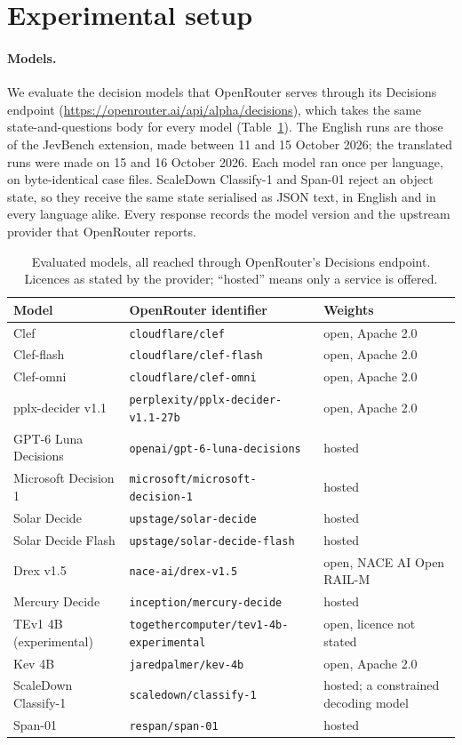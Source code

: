 \section{Experimental setup}
\label{sec:setup}

\paragraph{Models.} We evaluate the \MLnModels{} decision models that
OpenRouter serves through its Decisions endpoint
(\url{https://openrouter.ai/api/alpha/decisions}), which takes the same
state-and-questions body for every model (Table~\ref{tab:models}). The
English runs are those of the JevBench extension, made between 11 and 15
October 2026; the translated runs were made on 15 and 16 October 2026. Each
model ran once per language, on byte-identical case files. ScaleDown
Classify-1 and Span-01 reject an object state, so they receive the same state
serialised as JSON text, in English and in every language alike. Every
response records the model version and the upstream provider that OpenRouter
reports.

\begin{table}[t]
\centering
\caption{Evaluated models, all reached through OpenRouter's Decisions endpoint.
Licences as stated by the provider; ``hosted'' means only a service is
offered.}
\label{tab:models}
\small
\begin{tabular}{@{}lll@{}}
\toprule
Model & OpenRouter identifier & Weights \\
\midrule
Clef & \texttt{cloudflare/clef} & open, Apache 2.0 \\
Clef-flash & \texttt{cloudflare/clef-flash} & open, Apache 2.0 \\
Clef-omni & \texttt{cloudflare/clef-omni} & open, Apache 2.0 \\
pplx-decider v1.1 & \texttt{perplexity/pplx-decider-v1.1-27b} & open, Apache 2.0 \\
GPT-6 Luna Decisions & \texttt{openai/gpt-6-luna-decisions} & hosted \\
Microsoft Decision 1 & \texttt{microsoft/microsoft-decision-1} & hosted \\
Solar Decide & \texttt{upstage/solar-decide} & hosted \\
Solar Decide Flash & \texttt{upstage/solar-decide-flash} & hosted \\
Drex v1.5 & \texttt{nace-ai/drex-v1.5} & open, NACE AI Open RAIL-M \\
Mercury Decide & \texttt{inception/mercury-decide} & hosted \\
TEv1 4B (experimental) & \texttt{togethercomputer/tev1-4b-experimental} & open, licence not stated \\
Kev 4B & \texttt{jaredpalmer/kev-4b} & open, Apache 2.0 \\
ScaleDown Classify-1 & \texttt{scaledown/classify-1} & hosted; a constrained decoding model \\
Span-01 & \texttt{respan/span-01} & hosted \\
\bottomrule
\end{tabular}
\end{table}

